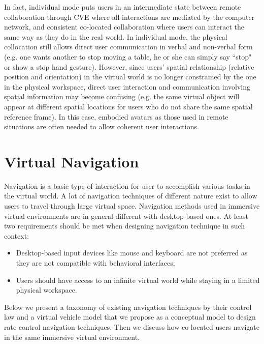 In fact, individual mode puts users in an intermediate state between remote collaboration through CVE where all interactions are mediated by the computer network, and consistent co-located collaboration where users can interact the same way as they do in the real world. In individual mode, the physical collocation still allows direct user communication in verbal and non-verbal form (e.g. one wants another to stop moving a table, he or she can simply say ``stop" or show a stop hand gesture). However, since users' spatial relationship (relative position and orientation) in the virtual world is no longer constrained by the one in the physical workspace, direct user interaction and communication involving spatial information may become confusing (e.g. the same virtual object will appear at different spatial locations for users who do not share the same spatial reference frame). In this case, embodied avatars as those used in remote situations are often needed to allow coherent user interactions.



\section{Virtual Navigation}
\label{sec:navigation}
Navigation is a basic type of interaction for user to accomplish various tasks in the virtual world. A lot of navigation techniques of different nature exist to allow users to travel through large virtual space. Navigation methods used in immersive virtual environments are in general different with desktop-based ones. At least two requirements should be met when designing navigation technique in such context:

\begin{itemize}
\item Desktop-based input devices like mouse and keyboard are not preferred as they are not compatible with behavioral interfaces;
\item Users should have access to an infinite virtual world while staying in a limited physical workspace.
\end{itemize}

Below we present a taxonomy of existing navigation techniques by their control law and a virtual vehicle model that we propose as a conceptual model to design rate control navigation techniques. Then we discuss how co-located users navigate in the same immersive virtual environment.

